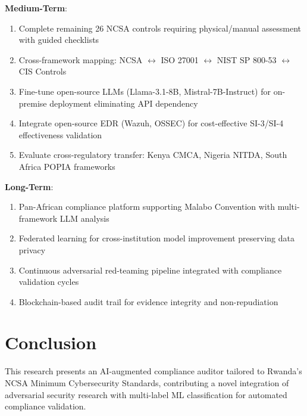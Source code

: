 \documentclass[11pt,conference]{IEEEtran}
\begin{document}
\textbf{Medium-Term}:
\begin{enumerate}
    \item Complete remaining 26 NCSA controls requiring physical/manual assessment with guided checklists
    \item Cross-framework mapping: NCSA $\leftrightarrow$ ISO 27001 $\leftrightarrow$ NIST SP 800-53 $\leftrightarrow$ CIS Controls
    \item Fine-tune open-source LLMs (Llama-3.1-8B, Mistral-7B-Instruct) for on-premise deployment eliminating API dependency
    \item Integrate open-source EDR (Wazuh, OSSEC) for cost-effective SI-3/SI-4 effectiveness validation
    \item Evaluate cross-regulatory transfer: Kenya CMCA, Nigeria NITDA, South Africa POPIA frameworks
\end{enumerate}

\textbf{Long-Term}:
\begin{enumerate}
    \item Pan-African compliance platform supporting Malabo Convention with multi-framework LLM analysis
    \item Federated learning for cross-institution model improvement preserving data privacy
    \item Continuous adversarial red-teaming pipeline integrated with compliance validation cycles
    \item Blockchain-based audit trail for evidence integrity and non-repudiation
\end{enumerate}

\section{Conclusion}

This research presents an AI-augmented compliance auditor tailored to Rwanda's NCSA Minimum Cybersecurity Standards, contributing a novel integration of adversarial security research with multi-label ML classification for automated compliance validation.
\end{document}
